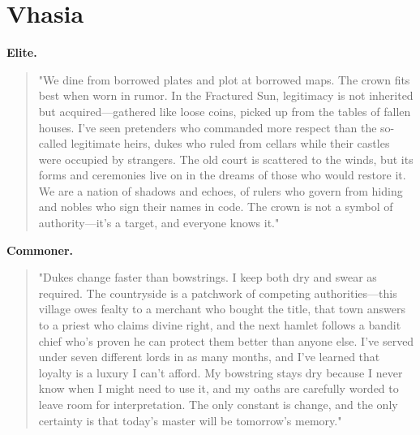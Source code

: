 \section*{Vhasia}
\textbf{Elite.}
\begin{quote}
"We dine from borrowed plates and plot at borrowed maps. The crown fits best when worn in rumor. In the Fractured Sun, legitimacy is not inherited but acquired—gathered like loose coins, picked up from the tables of fallen houses. I've seen pretenders who commanded more respect than the so-called legitimate heirs, dukes who ruled from cellars while their castles were occupied by strangers. The old court is scattered to the winds, but its forms and ceremonies live on in the dreams of those who would restore it. We are a nation of shadows and echoes, of rulers who govern from hiding and nobles who sign their names in code. The crown is not a symbol of authority—it's a target, and everyone knows it."
\end{quote}
\textbf{Commoner.}
\begin{quote}
"Dukes change faster than bowstrings. I keep both dry and swear as required. The countryside is a patchwork of competing authorities—this village owes fealty to a merchant who bought the title, that town answers to a priest who claims divine right, and the next hamlet follows a bandit chief who's proven he can protect them better than anyone else. I've served under seven different lords in as many months, and I've learned that loyalty is a luxury I can't afford. My bowstring stays dry because I never know when I might need to use it, and my oaths are carefully worded to leave room for interpretation. The only constant is change, and the only certainty is that today's master will be tomorrow's memory."
\end{quote}

